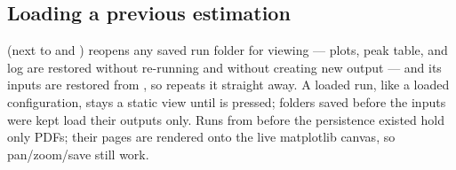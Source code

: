 \subsection{Loading a previous estimation}

 (next to  and ) reopens any
saved  run folder for viewing --- plots,
peak table, and log are restored without re-running and without
creating new output --- and its inputs are restored from
, so  repeats it straight away.
A loaded run, like a loaded configuration, stays a static view until
 is pressed; folders saved before the inputs were kept load
their outputs only. Runs from before the  persistence
existed hold only PDFs; their pages are rendered onto the live
matplotlib canvas, so pan/zoom/save still work.
